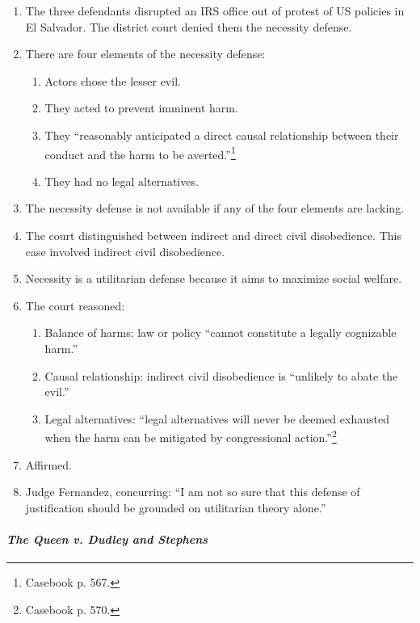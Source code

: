 \begin{enumerate}
    \item The three defendants disrupted an IRS office out of protest of US 
    policies in El Salvador. The district court denied them the necessity 
    defense.
    \item There are four elements of the necessity defense:
    \begin{enumerate}
        \item Actors chose the lesser evil.
        \item They acted to prevent imminent harm.
        \item They ``reasonably anticipated a direct causal relationship 
        between their conduct and the harm to be averted.''\footnote{Casebook 
        p. 567.}
        \item They had no legal alternatives.
    \end{enumerate}
    \item The necessity defense is not available if any of the four elements 
    are lacking.
    \item The court distinguished between indirect and direct civil 
    disobedience. This case involved indirect civil disobedience.
    \item Necessity is a utilitarian defense because it aims to maximize 
    social welfare.
    \item The court reasoned:
    \begin{enumerate}
        \item Balance of harms: law or policy ``cannot constitute a legally 
        cognizable harm.''
        \item Causal relationship: indirect civil disobedience is ``unlikely 
        to abate the evil.''
        \item Legal alternatives: ``legal alternatives will never be deemed 
        exhausted when the harm can be mitigated by congressional 
        action.''\footnote{Casebook p. 570.}
    \end{enumerate}
    \item Affirmed.
    \item Judge Fernandez, concurring: ``I am not so sure that this defense of 
    justification should be grounded on utilitarian theory alone.''
\end{enumerate}

\paragraph{\emph{The Queen v. Dudley and Stephens}}

